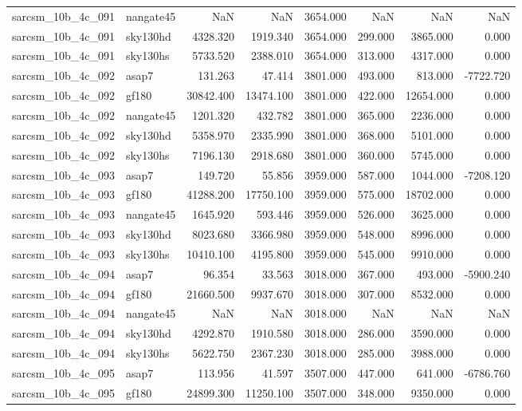 \begin{tabular}{llrrrrrr}
sarcsm\_10b\_4c\_091 & nangate45 & NaN & NaN & 3654.000 & NaN & NaN & NaN \\
sarcsm\_10b\_4c\_091 & sky130hd & 4328.320 & 1919.340 & 3654.000 & 299.000 & 3865.000 & 0.000 \\
sarcsm\_10b\_4c\_091 & sky130hs & 5733.520 & 2388.010 & 3654.000 & 313.000 & 4317.000 & 0.000 \\
sarcsm\_10b\_4c\_092 & asap7 & 131.263 & 47.414 & 3801.000 & 493.000 & 813.000 & -7722.720 \\
sarcsm\_10b\_4c\_092 & gf180 & 30842.400 & 13474.100 & 3801.000 & 422.000 & 12654.000 & 0.000 \\
sarcsm\_10b\_4c\_092 & nangate45 & 1201.320 & 432.782 & 3801.000 & 365.000 & 2236.000 & 0.000 \\
sarcsm\_10b\_4c\_092 & sky130hd & 5358.970 & 2335.990 & 3801.000 & 368.000 & 5101.000 & 0.000 \\
sarcsm\_10b\_4c\_092 & sky130hs & 7196.130 & 2918.680 & 3801.000 & 360.000 & 5745.000 & 0.000 \\
sarcsm\_10b\_4c\_093 & asap7 & 149.720 & 55.856 & 3959.000 & 587.000 & 1044.000 & -7208.120 \\
sarcsm\_10b\_4c\_093 & gf180 & 41288.200 & 17750.100 & 3959.000 & 575.000 & 18702.000 & 0.000 \\
sarcsm\_10b\_4c\_093 & nangate45 & 1645.920 & 593.446 & 3959.000 & 526.000 & 3625.000 & 0.000 \\
sarcsm\_10b\_4c\_093 & sky130hd & 8023.680 & 3366.980 & 3959.000 & 548.000 & 8996.000 & 0.000 \\
sarcsm\_10b\_4c\_093 & sky130hs & 10410.100 & 4195.800 & 3959.000 & 545.000 & 9910.000 & 0.000 \\
sarcsm\_10b\_4c\_094 & asap7 & 96.354 & 33.563 & 3018.000 & 367.000 & 493.000 & -5900.240 \\
sarcsm\_10b\_4c\_094 & gf180 & 21660.500 & 9937.670 & 3018.000 & 307.000 & 8532.000 & 0.000 \\
sarcsm\_10b\_4c\_094 & nangate45 & NaN & NaN & 3018.000 & NaN & NaN & NaN \\
sarcsm\_10b\_4c\_094 & sky130hd & 4292.870 & 1910.580 & 3018.000 & 286.000 & 3590.000 & 0.000 \\
sarcsm\_10b\_4c\_094 & sky130hs & 5622.750 & 2367.230 & 3018.000 & 285.000 & 3988.000 & 0.000 \\
sarcsm\_10b\_4c\_095 & asap7 & 113.956 & 41.597 & 3507.000 & 447.000 & 641.000 & -6786.760 \\
sarcsm\_10b\_4c\_095 & gf180 & 24899.300 & 11250.100 & 3507.000 & 348.000 & 9350.000 & 0.000 \\

\end{tabular}
